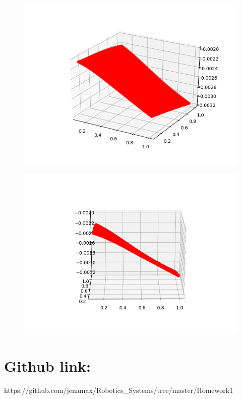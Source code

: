 \documentclass[12pt]{article}
\begin{document}
\begin{itemize}
		\begin{figure}[H]
			\includegraphics[scale=0.5]{z1.png}
		\end{figure}
		\begin{figure}[H]
			\includegraphics[scale=0.5]{z2.png}
		\end{figure}
	
	\end{itemize}

	\section{Github link:} 
	https://github.com/jenamax/Robotics_Systems/tree/master/Homework1
\end{document}
